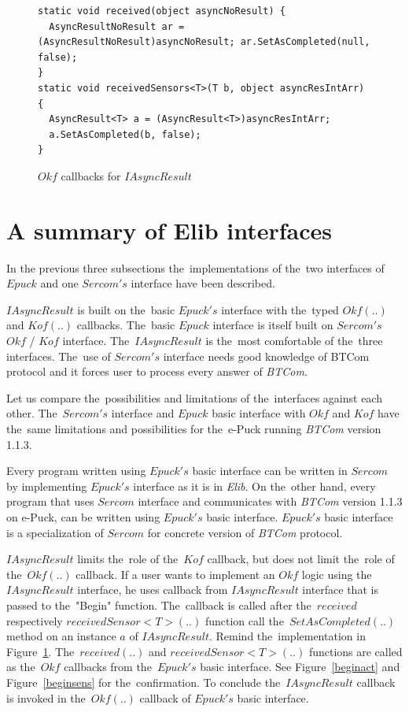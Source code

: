 \begin{figure}[!hbp]
\begin{lstlisting}
static void received(object asyncNoResult) {
  AsyncResultNoResult ar = (AsyncResultNoResult)asyncNoResult; ar.SetAsCompleted(null, false); 
}
static void receivedSensors<T>(T b, object asyncResIntArr) {
  AsyncResult<T> a = (AsyncResult<T>)asyncResIntArr;
  a.SetAsCompleted(b, false);
}
\end{lstlisting}	
\caption{$Okf$ callbacks for $IAsyncResult$} \label{Iokfs}
\end{figure}

\section{A summary of Elib interfaces}
\label{sec:suminterface}
  In the previous three subsections the~implementations of the~two interfaces of $Epuck$ 
  and one $Sercom's$ interface have been described.

  $IAsyncResult$ is built on the~basic $Epuck's$ interface with the~typed $Okf(..)$ and $Kof(..)$ callbacks. 
  The~basic $Epuck$ interface is itself built on $Sercom's$ $Okf$ / $Kof$ interface.
  The~$IAsyncResult$ is the~most comfortable of the~three interfaces. 
  The~use of $Sercom's$ interface needs good knowledge of BTCom protocol and 
  it forces user to process every answer of {\it BTCom}.

  Let us compare the~possibilities and limitations of the~interfaces against each other.
  The~$Sercom's$ interface and $Epuck$ basic interface with $Okf$ and $Kof$ 
  have the~same limitations and possibilities for the~e-Puck running {\it BTCom} version 1.1.3. 
  
  Every program written using $Epuck's$ basic interface can be written
  in $Sercom$ by implementing $Epuck's$ interface as it is in {\it Elib}.
  On the~other hand, every program that uses $Sercom$ interface and communicates with {\it BTCom}
  version 1.1.3 on e-Puck, can be written using $Epuck's$ basic interface. 
  $Epuck's$ basic interface is a specialization of $Sercom$ for concrete version of {\it BTCom}
  protocol.

  $IAsyncResult$ limits the~role of the~$Kof$ callback, but does not limit the~role of the~$Okf(..)$ callback.
  If a user wants to implement an $Okf$ logic using the~$IAsyncResult$ interface, he uses callback from $IAsyncResult$
  interface that is passed to the~"Begin" function.
  The~callback is called after the~$received$ respectively $receivedSensor<T>(..)$ function  call 
  the~$SetAsCompleted(..)$ method on an instance $a$ of $IAsyncResult$. 
  Remind the~implementation in Figure~\ref{Iokfs}.
  The~$received(..)$ and $receivedSensor<T>(..)$ functions are called as the~$Okf$ callbacks
  from the~$Epuck's$ basic interface.
  See Figure~\ref{beginact} and Figure~\ref{beginsens} for the~confirmation.
  To conclude the~$IAsyncResult$ callback is invoked in the~$Okf(..)$ callback of $Epuck's$ basic interface.


